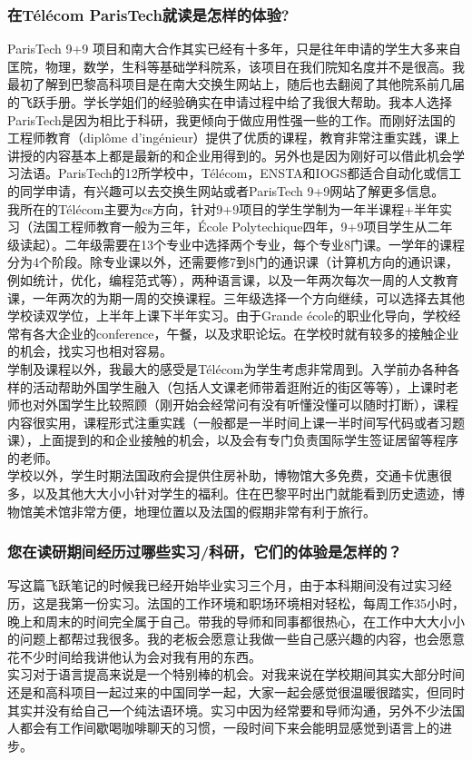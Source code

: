\documentclass[a4paper,UTF8]{book}
\begin{document}
    \subsubsection*{在Télécom ParisTech就读是怎样的体验?}
    ParisTech 9+9 项目和南大合作其实已经有十多年，只是往年申请的学生大多来自匡院，物理，数学，生科等基础学科院系，该项目在我们院知名度并不是很高。我最初了解到巴黎高科项目是在南大交换生网站上，随后也去翻阅了其他院系前几届的飞跃手册。学长学姐们的经验确实在申请过程中给了我很大帮助。我本人选择ParisTech是因为相比于科研，我更倾向于做应用性强一些的工作。而刚好法国的工程师教育（diplôme d’ingénieur）提供了优质的课程，教育非常注重实践，课上讲授的内容基本上都是最新的和企业用得到的。另外也是因为刚好可以借此机会学习法语。ParisTech的12所学校中，Télécom，ENSTA和IOGS都适合自动化或信工的同学申请，有兴趣可以去交换生网站或者ParisTech 9+9网站了解更多信息。\\
    我所在的Télécom主要为cs方向，针对9+9项目的学生学制为一年半课程+半年实习（法国工程师教育一般为三年，École Polytechique四年，9+9项目学生从二年级读起）。二年级需要在13个专业中选择两个专业，每个专业8门课。一学年的课程分为4个阶段。除专业课以外，还需要修7到8门的通识课（计算机方向的通识课，例如统计，优化，编程范式等），两种语言课，以及一年两次每次一周的人文教育课，一年两次的为期一周的交换课程。三年级选择一个方向继续，可以选择去其他学校读双学位，上半年上课下半年实习。由于Grande école的职业化导向，学校经常有各大企业的conference，午餐，以及求职论坛。在学校时就有较多的接触企业的机会，找实习也相对容易。\\
    学制及课程以外，我最大的感受是Télécom为学生考虑非常周到。入学前办各种各样的活动帮助外国学生融入（包括人文课老师带着逛附近的街区等等），上课时老师也对外国学生比较照顾（刚开始会经常问有没有听懂没懂可以随时打断），课程内容很实用，课程形式注重实践（一般都是一半时间上课一半时间写代码或者习题课），上面提到的和企业接触的机会，以及会有专门负责国际学生签证居留等程序的老师。\\
    学校以外，学生时期法国政府会提供住房补助，博物馆大多免费，交通卡优惠很多，以及其他大大小小针对学生的福利。住在巴黎平时出门就能看到历史遗迹，博物馆美术馆非常方便，地理位置以及法国的假期非常有利于旅行。
    
    \subsubsection*{您在读研期间经历过哪些实习/科研，它们的体验是怎样的？}
    写这篇飞跃笔记的时候我已经开始毕业实习三个月，由于本科期间没有过实习经历，这是我第一份实习。法国的工作环境和职场环境相对轻松，每周工作35小时，晚上和周末的时间完全属于自己。带我的导师和同事都很热心，在工作中大大小小的问题上都帮过我很多。我的老板会愿意让我做一些自己感兴趣的内容，也会愿意花不少时间给我讲他认为会对我有用的东西。\\
    实习对于语言提高来说是一个特别棒的机会。对我来说在学校期间其实大部分时间还是和高科项目一起过来的中国同学一起，大家一起会感觉很温暖很踏实，但同时其实并没有给自己一个纯法语环境。实习中因为经常要和导师沟通，另外不少法国人都会有工作间歇喝咖啡聊天的习惯，一段时间下来会能明显感觉到语言上的进步。
    
\end{document}
